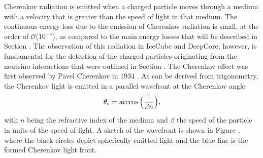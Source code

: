 Cherenkov radiation is emitted when a charged particle moves through a medium with a velocity that is greater than the speed of light in that medium.
The continuous energy loss due to the emission of Cherenkov radiation is small, at the order of $\mathcal{O}$($10^{-4}$), as compared to the main energy losses that will be described in Section .
The observation of this radiation in IceCube and DeepCore, however, is fundamental for the detection of the charged particles originating from the neutrino interactions that were outlined in Section .
The Cherenkov effect was first observed by Pavel Cherenkov in 1934 .
As can be derived from trigonometry, the Cherenkov light is emitted in a parallel wavefront at the Cherenkov angle
\begin{equation}
    \theta_c = \arccos\Big(\frac{1}{\beta n}\Big),
    \labeq{cherenkov_angle}
\end{equation}
with $n$ being the refractive index of the medium and $\beta$ the speed of the particle in units of the speed of light.
A sketch of the wavefront is shown in Figure , where the black circles depict spherically emitted light and the blue line is the formed Cherenkov light front.
